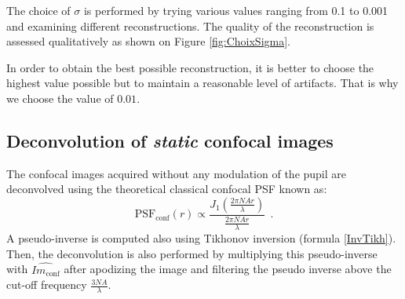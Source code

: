 \documentclass[%
reprint,
 amsmath,amssymb,
 aps,
]{revtex4-2}
\begin{document}
The choice of $\sigma$ is performed by trying various values ranging from 0.1 to 0.001 and examining different reconstructions. The quality of the reconstruction is assessed qualitatively as shown on Figure \ref{fig:ChoixSigma}.

In order to obtain the best possible reconstruction, it is better to choose the highest value possible but to maintain  a reasonable level of artifacts. That is why we choose the value of $0.01$.

\subsection{Deconvolution of \textit{static} confocal images}

The confocal images acquired without any modulation of the pupil are deconvolved using the theoretical classical confocal PSF known as:
\begin{equation}
    \textrm{PSF}_{\textrm{conf}}(r) \propto \frac{J_1\left(\frac{2 \pi N\!A r}{\lambda}\right)}{\frac{2 \pi N\!A r}{\lambda}} \ \ .
\end{equation}
A pseudo-inverse is computed also using Tikhonov inversion (formula \ref{InvTikh}). Then, the deconvolution is also performed by multiplying this pseudo-inverse with $\widehat{Im_{\textrm{conf}}}$ after apodizing the image and filtering the pseudo inverse above the cut-off frequency $\frac{3 N\!A}{\lambda}$.
\end{document}
